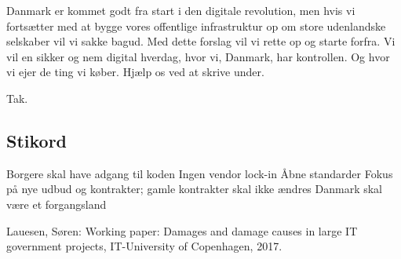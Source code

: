 \documentclass[fleqn]{article}
\begin{document}
Danmark er kommet godt fra start i den digitale revolution, men hvis vi fortsætter
med at bygge vores offentlige infrastruktur op om store udenlandske selskaber
vil vi sakke bagud.
Med dette forslag vil vi rette op og starte forfra. Vi vil en sikker og nem digital
hverdag, hvor vi, Danmark, har kontrollen. Og hvor vi ejer de ting vi køber.
Hjælp os ved at skrive under.

Tak.

\subsection{Stikord}
Borgere skal have adgang til koden
Ingen vendor lock-in
Åbne standarder
Fokus på nye udbud og kontrakter; gamle kontrakter skal ikke ændres
Danmark skal være et forgangsland

\begin{thebibliography}{1}

 Lauesen, Søren: Working paper: Damages and damage causes in
large IT government projects, IT-University of Copenhagen, 2017.
\end{thebibliography}
\end{document}

